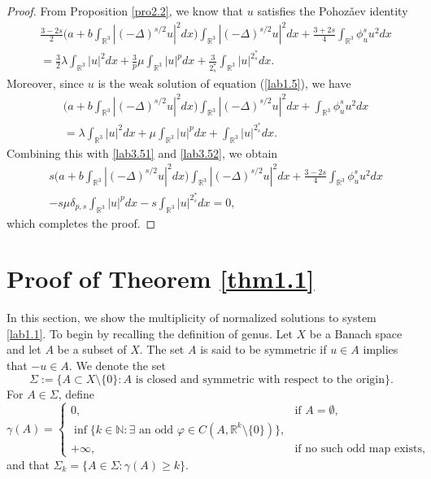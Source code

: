 \documentclass[10pt,a4paper]{amsart}
\numberwithin{equation}{section}
\begin{document}
\begin{proof}
From Proposition \ref{pro2.2}, we know that $u$ satisfies the Pohoz\v{a}ev identity
\begin{equation}\label{lab3.51}
\begin{split}
&\frac{3-2s}{2}\Big(a+b\int_{\mathbb{R}^3}|(-\Delta)^{s/2}u|^2dx\Big)
 \int_{\mathbb{R}^3}|(-\Delta)^{s/2}u|^2dx
 +\frac{3+2s}{4}\int_{\mathbb{R}^3}\phi^s_u u^2dx\\
&=\frac{3}{2}\lambda \int_{\mathbb{R}^3}|u|^2dx
 + \frac{3}{p}\mu \int_{\mathbb{R}^3}|u|^pdx
 +\frac{3}{2^*_s}\int_{\mathbb{R}^3}|u|^{2^*_s}dx.
\end{split}
\end{equation}
Moreover, since $u$ is the weak solution of equation ({\ref{lab1.5}}), we have
\begin{equation}\label{lab3.52}
\begin{split}
&\Big(a+b\int_{\mathbb{R}^3}|(-\Delta)^{s/2}u|^2dx\Big)
 \int_{\mathbb{R}^3}|(-\Delta)^{s/2}u|^2dx
 +\int_{\mathbb{R}^3}\phi^s_u u^2dx\\
&=\lambda \int_{\mathbb{R}^3}|u|^2dx+\mu \int_{\mathbb{R}^3}|u|^pdx
 +\int_{\mathbb{R}^3}|u|^{2^*_s}dx.
\end{split}
\end{equation}
Combining this with \eqref{lab3.51} and \eqref{lab3.52}, we obtain
\begin{align*}
&s\Big(a+b\int_{\mathbb{R}^3}|(-\Delta)^{s/2}u|^2dx\Big)
 \int_{\mathbb{R}^3}|(-\Delta)^{s/2}u|^2dx
 +\frac{3-2s}{4}\int_{\mathbb{R}^3}\phi^s_u u^2dx\\
&-s\mu \delta_{p,s}\int_{\mathbb{R}^3}|u|^pdx-s\int_{\mathbb{R}^3}|u|^{2^*_s}dx=0,
\end{align*}
which completes the proof.
\end{proof}

\section{Proof of Theorem \ref{thm1.1}}
In this section, we show the multiplicity of normalized solutions to  system \eqref{lab1.1}.
To begin by recalling the definition of genus.
Let $X$ be a Banach space and let $A$ be a subset of $X$. The set $A$ is said to be
symmetric if $u\in A$ implies that $-u\in A$. We denote the set
$$
\Sigma :=\{A\subset X\setminus \{0\}: A \text{ is closed and symmetric with respect
 to the origin}\}.
$$
For $A\in\Sigma$, define
\[
\gamma(A) =
\begin{cases}
0, & \text{if } A = \emptyset, \\
\inf\{k \in \mathbb{N}: \exists \text{ an odd }
\varphi \in C(A, \mathbb{R}^k \setminus \{0\})\}, \\
+\infty,& \text{if no such odd map exists,}
\end{cases}
\]
and that $\Sigma_k=\{A\in \Sigma:\gamma(A)\geq k\}$.
\end{document}
